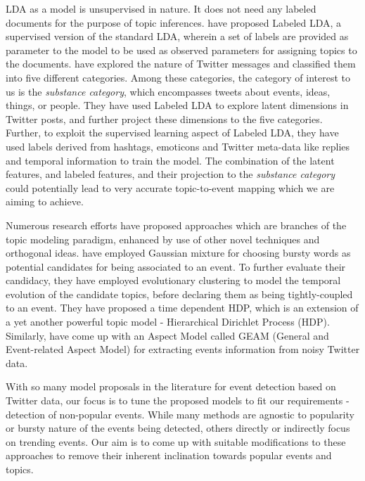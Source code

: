 LDA as a model is unsupervised in nature. It does not need any labeled documents for the purpose of topic inferences. \cite{ramage2009labeled} have proposed Labeled LDA, a supervised version of the standard LDA, wherein a set of labels are provided as parameter to the model to be used as observed parameters for assigning topics to the documents. \cite{ramage2010characterizing} have explored the nature of Twitter messages and classified them into five different categories. Among these categories, the category of interest to us is the \emph{substance category}, which encompasses tweets about events, ideas, things, or people. They have used Labeled LDA to explore latent dimensions in Twitter posts, and further project these dimensions to the five categories. Further, to exploit the supervised learning aspect of Labeled LDA, they have used labels derived from hashtags, emoticons and Twitter meta-data like replies and temporal information to train the model. The combination of the latent features, and labeled features, and their projection to the \emph{substance category} could potentially lead to very accurate topic-to-event mapping which we are aiming to achieve.

Numerous research efforts have proposed approaches which are branches of the topic modeling paradigm, enhanced by use of other novel techniques and orthogonal ideas. \cite{wang2013real} have employed Gaussian mixture for choosing bursty words as potential candidates for being associated to an event. To further evaluate their candidacy, they have employed evolutionary clustering to model the temporal evolution of the candidate topics, before declaring them as being tightly-coupled to an event. They have proposed a time dependent HDP, which is an extension of a yet another powerful topic model - Hierarchical Dirichlet Process (HDP). Similarly, \cite{you2013geam} have come up with an Aspect Model called GEAM (General and Event-related Aspect Model) for extracting events information from noisy Twitter data.

With so many model proposals in the literature for event detection based on Twitter data, our focus is to tune the proposed models to fit our requirements - detection of non-popular events. While many methods are agnostic to popularity or bursty nature of the events being detected, others directly or indirectly focus on trending events. Our aim is to come up with suitable modifications to these approaches to remove their inherent inclination towards popular events and topics.

